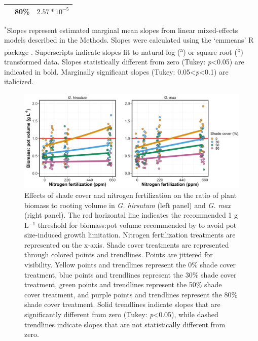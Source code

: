 \begin{landscape}
\begin{table}
\begin{tabular}{p{0.5cm}p{2cm}p{3cm}}
            & \multicolumn{1}{r}{80\%}
            &  \multicolumn{1}{r}{\textit{$2.57*10^{-5}$}} 
            \\
            \hline
        \end{tabular}%
        \label{tab:tablec.3}
    \end{table}
    \begin{singlespace}
        \noindent $^*$Slopes represent estimated marginal mean slopes from linear mixed-effects models described in the Methods. Slopes were calculated using the `emmeans’ R package . Superscripts indicate slopes fit to natural-log (\textsuperscript{a}) or square root (\textsuperscript{b}) transformed data. Slopes statistically different from zero (Tukey: \textit{p}<0.05) are indicated in bold. Marginally significant slopes (Tukey: 0.05<\textit{p}<0.1) are italicized.
    \end{singlespace}
\end{landscape}
\clearpage

\newpage
\begin{landscape}
\begin{figure}
    \centering
    \includegraphics[width=\columnwidth]{ch2_LxN_Greenhouse/figs/figs1_bvr.jpg}
    \caption[Effects of shade cover and nitrogen fertilization on the ratio of plant biomass to rooting volume in \textit{G. hirsutum} and \textit{G. max}.]{Effects of shade cover and nitrogen fertilization on the ratio of plant biomass to rooting volume in \textit{G. hirsutum} (left panel) and \textit{G. max} (right panel). The red horizontal line indicates the recommended 1 g L$^{-1}$ threshold for biomass:pot volume recommended by  to avoid pot size-induced growth limitation. Nitrogen fertilization treatments are represented on the x-axis. Shade cover treatments are represented through colored points and trendlines. Points are jittered for visibility. Yellow points and trendlines represent the 0\% shade cover treatment, blue points and trendlines represent the 30\% shade cover treatment, green points and trendlines represent the 50\% shade cover treatment, and purple points and trendlines represent the 80\% shade cover treatment. Solid trendlines indicate slopes that are significantly different from zero (Tukey: \textit{p}<0.05), while dashed trendlines indicate slopes that are not statistically different from zero.}
    \label{fig:figure.a1}
\end{figure}
\end{landscape}
\clearpage